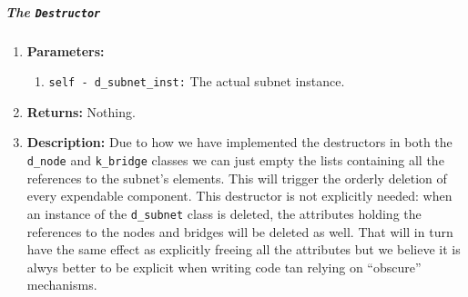         \subparagraph{The \texttt{Destructor}}
            \begin{enumerate}
                \item \textbf{Parameters:}
                \begin{enumerate}
                    \item \texttt{self - d\_subnet\_inst:} The actual subnet instance.
                \end{enumerate}
                \item \textbf{Returns:} Nothing.
                \item \textbf{Description:} Due to how we have implemented the destructors in both the \texttt{d\_node} and \texttt{k\_bridge} classes we can just empty the lists containing all the references to the subnet's elements. This will trigger the orderly deletion of every expendable component. This destructor is not explicitly needed: when an instance of the \texttt{d\_subnet} class is deleted, the attributes holding the references to the nodes and bridges will be deleted as well. That will in turn have the same effect as explicitly freeing all the attributes but we believe it is alwys better to be explicit when writing code tan relying on ``obscure'' mechanisms.
            \end{enumerate}